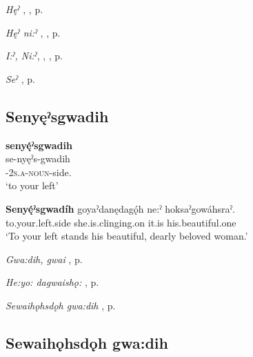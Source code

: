 \begin{CayugaRelated}
\item \textit{Hęˀ} , , p. \pageref{p:[hęˀ]}\\
\item \textit{Hęˀ ni:ˀ} , , p. \pageref{p:[hęˀ ni:ˀ]}\\
\item \textit{I:ˀ, Ni:ˀ}, , , p. \pageref{p:[i:ˀ]}\\
\item \textit{Seˀ} , p. \pageref{p:[seˀ]}
\end{CayugaRelated}

\subsection*{\textbf{Senyęˀsgwadih} } \label{p:[senyęˀsgwadih]}


\ea
\label{ex:spart400}
\glll \textbf{senyę́ˀsgwadih} {}\\
se-nyęˀs-gwadih\\
\textsc{\repetitive-2s.a-noun}-side.{\stative}\\
\glt ‘to your left’
\z

\ea
\label{ex:spart4}
\gll \textbf{Senyę́ˀsgwadíh} goyaˀdanędagǫ́h ne:ˀ hoksaˀgowáhsraˀ.\\
to.your.left.side she.is.clinging.on it.is his.beautiful.one\\
\glt ‘To your left stands his beautiful, dearly beloved woman.’
\z

\begin{CayugaRelated}
\item \textit{Gwa:dih, gwai} , p. \pageref{p:[gwa:dih]}\\
\item \textit{He:yo: dagwaishǫ:} , p. \pageref{p:[he:yo: dagwaishǫ:]}\\
\item \textit{Sewaihǫhsdǫh gwa:dih} , p. \pageref{p:[sewaihǫhsdǫh gwa:dih]}
\end{CayugaRelated}

\subsection*{\textbf{Sewaihǫhsdǫh gwa:dih} } \label{p:[sewaihǫhsdǫh gwa:dih]}

